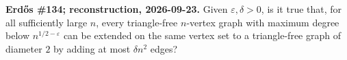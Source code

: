 \textbf{Erd\H{o}s \#134; reconstruction, 2026-09-23.}
Given $\varepsilon,\delta>0$, is it true that, for all sufficiently large
$n$, every triangle-free $n$-vertex graph with maximum degree below
$n^{1/2-\varepsilon}$ can be extended on the same vertex set to a
triangle-free graph of diameter $2$ by adding at most $\delta n^2$ edges?
